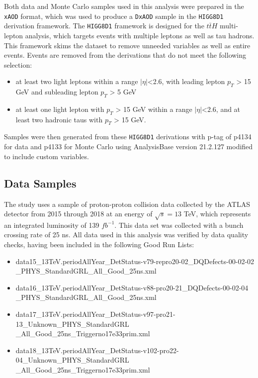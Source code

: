 
Both data and Monte Carlo samples used in this analysis were prepared in the \verb|xAOD| format, which was used to produce a \verb|DxAOD| sample in the \verb|HIGG8D1| derivation framework. The \verb|HIGG8D1| framework is designed for the $t\bar{t}H$ multi-lepton analysis, which targets events with multiple leptons as well as tau hadrons. This framework skims the dataset to remove unneeded variables as well as entire events. Events are removed from the derivations that do not meet the following selection:

\begin{itemize}
    \item at least two light leptons within a range $|\eta|$<2.6, with leading lepton $p_{T}$ > 15 GeV and subleading lepton $p_{T}$ > 5 GeV
    \item at least one light lepton with $p_{T}$ > 15 GeV within a range $|\eta|$<2.6, and at least two hadronic taus with $p_{T}$ > 15 GeV.
\end{itemize}

Samples were then generated from these \verb|HIGG8D1| derivations with p-tag of p4134 for data and p4133 for Monte Carlo using AnalysisBase version 21.2.127 modified to include custom variables.

\subsection{Data Samples}

The study uses a sample of proton-proton collision data collected by the ATLAS detector from 2015 through 2018 at an energy of $\sqrt{s} = 13$ TeV, which represents an integrated luminosity of 139 $fb^{-1}$. This data set was collected with a bunch crossing rate of 25 ns. All data used in this analysis was verified by data quality checks, having been included in the following Good Run Lists: 
\begin{itemize}
    \item data15\_13TeV.periodAllYear\_DetStatus-v79-repro20-02\_DQDefects-00-02-02\\\_PHYS\_StandardGRL\_All\_Good\_25ns.xml
    \item data16\_13TeV.periodAllYear\_DetStatus-v88-pro20-21\_DQDefects-00-02-04\\\_PHYS\_StandardGRL\_All\_Good\_25ns.xml 
    \item data17\_13TeV.periodAllYear\_DetStatus-v97-pro21-13\_Unknown\_PHYS\_StandardGRL\\\_All\_Good\_25ns\_Triggerno17e33prim.xml 
    \item data18\_13TeV.periodAllYear\_DetStatus-v102-pro22-04\_Unknown\_PHYS\_StandardGRL\\\_All\_Good\_25ns\_Triggerno17e33prim.xml
\end{itemize}

